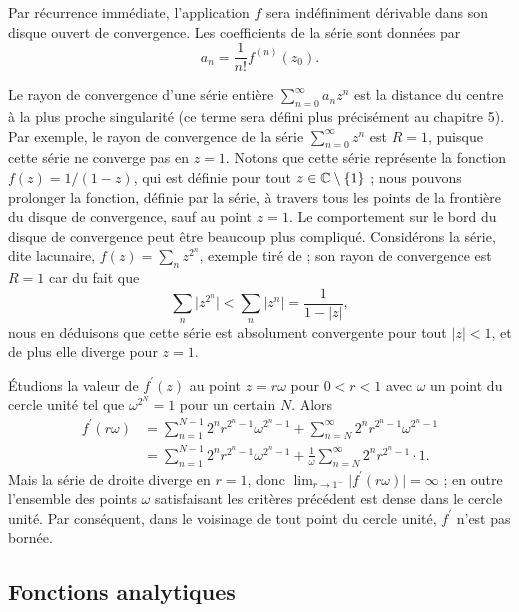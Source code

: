 Par récurrence immédiate, l'application $f$ sera indéfiniment dérivable dans son disque ouvert de convergence. Les coefficients de la série sont données par
\[a_n=\frac{1}{n!}f^{(n)}(z_0).\] 


\begin{rem}
Le rayon de convergence d'une série entière $\sum_{n=0}^\infty a_n z ^n$ est la distance du centre à la plus proche singularité (ce terme sera défini plus précisément au chapitre 5). Par exemple, le rayon de convergence de la série
$\sum_{n=0}^\infty z^n$ est $R=1$, puisque cette série ne converge pas en $z=1$. Notons que cette série représente la fonction $f(z)=1/(1-z)$, qui est définie pour tout $z \in \mathbb{C} \setminus \{1\}$ ; nous pouvons prolonger la fonction, définie par la série, à travers tous les points de la frontière du disque de convergence, sauf au point $z=1$. Le comportement sur le bord du disque de convergence peut être beaucoup plus compliqué. Considérons la série, dite lacunaire, $f(z)=\sum_n z^{2^n}$, exemple tiré de \cite{greene2006function} ; son rayon de convergence est $R=1$ car du fait que
\[\sum_n \lvert z^{2^n} \rvert < \sum_n \lvert z^{n} \rvert = \frac{1}{1-\lvert z \rvert},\]
nous en déduisons que cette série est absolument convergente pour tout $\lvert z \rvert <1$, et de plus elle diverge pour $z=1$.

Étudions la valeur de $f^\prime(z)$ au point $z=r \omega$ pour $0< r <1$ avec $\omega$ un point du cercle unité tel que $\omega^{2^N}=1$ pour un certain $N$. Alors
\begin{align*}
f^\prime(r \omega)&=\sum_{n=1}^{N-1} 2^n r^{2^n-1} \omega^{2^n-1} + \sum_{n=N}^{\infty} 2^n r^{2^n-1} \omega^{2^n-1} \\
&=\sum_{n=1}^{N-1} 2^n r^{2^n-1} \omega^{2^n-1} + \frac{1}{\omega}\sum_{n=N}^{\infty} 2^n r^{2^n-1} \cdot 1.
\end{align*}
Mais la série de droite diverge en $r=1$, donc $\lim_{r \to 1^-} \lvert f^\prime(r \omega) \rvert=\infty$ ; en outre l'ensemble des points $\omega$ satisfaisant les critères précédent est dense dans le cercle unité. Par conséquent, dans le voisinage de tout point du cercle unité, $f^\prime$ n'est pas bornée.

\end{rem}





\subsection{Fonctions analytiques}

